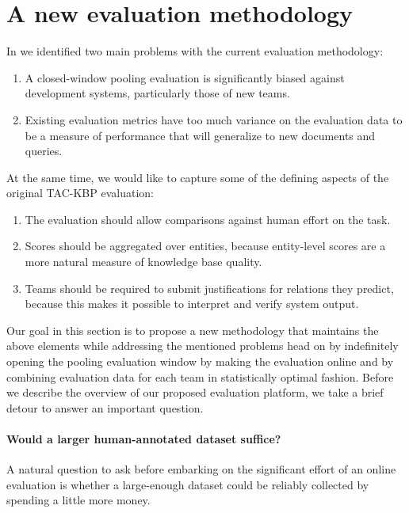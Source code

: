 \section{A new evaluation methodology}
\label{sec:methodology}

In  we identified two main problems with the current evaluation methodology:
\begin{enumerate}
  \item A closed-window pooling evaluation is significantly biased
    against development systems, particularly those of new teams.
  \item Existing evaluation metrics have too much variance on the
    evaluation data to be a measure of performance that will generalize
    to new documents and queries.
\end{enumerate}

At the same time, we would like to capture some of the defining aspects of the original TAC-KBP evaluation:
\begin{enumerate}
  \item The evaluation should allow comparisons against human effort on the task. %
  \item Scores should be aggregated over entities, because entity-level scores are a more natural measure of knowledge base quality.
  \item Teams should be required to submit justifications for relations they predict, because this makes it possible to interpret and verify system output.
\end{enumerate}

Our goal in this section is to propose a new methodology that maintains the above elements while addressing the mentioned problems head on 
  by indefinitely opening the pooling evaluation window by making the evaluation online 
  and by combining evaluation data for each team in statistically optimal fashion.
Before we describe the overview of our proposed evaluation platform, we take a brief detour to answer an important question.

\paragraph{Would a larger human-annotated dataset suffice?}
A natural question to ask before embarking on the significant effort of an online evaluation is whether a large-enough dataset could be reliably collected by spending a little more money. 

